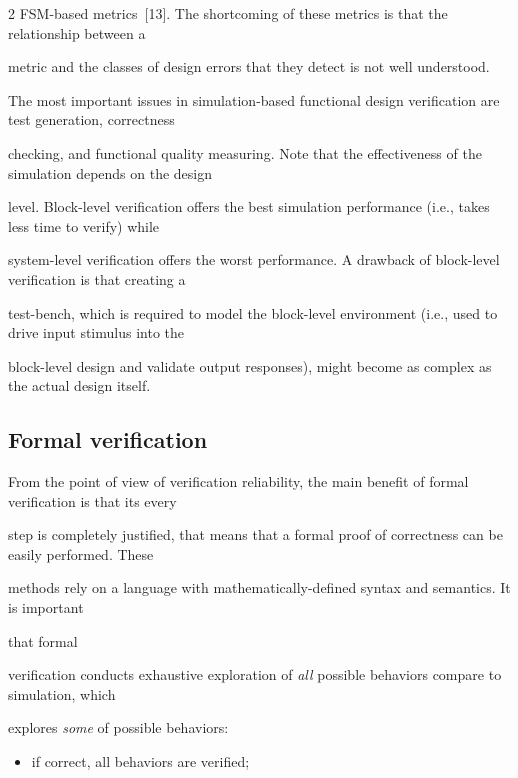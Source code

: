 \begin{multicols}{2}
FSM-based metrics~[13]. The shortcoming of these metrics is that the relationship between a


metric and the classes of design errors that they detect is not well understood.





   The most important issues in simulation-based function\-al design verification are test generation, correctness


checking, and functional quality measuring. Note that the effectiveness of the simulation depends on the design


level. Block-level verification offers the best simu\-lation performance (i.e., takes less time to verify) while


system-level verification offers the worst performance. A drawback of block-level verification is that creating a


test-bench, which is required to model the block-level environment (i.e., used to drive input stimulus into the


block-level design and validate output responses), might become as complex as the actual design itself.





\subsection{Formal verification} %





    \noindent


From the point of view of verification reliability, the main benefit of formal verification is that its every


step is completely justified, that means that a formal proof of correctness can be easily performed. These


methods rely on a language with mathematically-defined syntax and semantics. It is important


that formal


verification conducts exhaustive exploration of \textit{all} possible behaviors compare to simulation, which


explores \textit{some} of possible behaviors:


\begin{itemize}


\item  if correct, all behaviors are verified;



\end{itemize}
\end{multicols}
